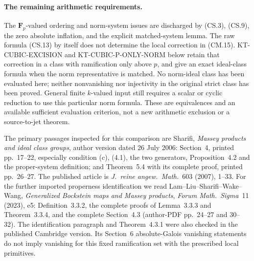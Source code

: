 \paragraph{The remaining arithmetic requirements.}
The \(\mathbf F_p\)-valued ordering and norm-system
issues are discharged by (CS.3), (CS.9), the zero
absolute inflation, and the explicit matched-system
lemma.  The raw formula (CS.13) by itself does not
determine the local correction in (CM.15).
KT-CUBIC-EXCISION and KT-CUBIC-P-ONLY-NORM below
retain that correction in a class with ramification
only above \(p\), and give an exact ideal-class
formula when the norm representative is matched.
No norm-ideal class has been evaluated here;
neither nonvanishing nor injectivity in the
original strict class has been proved.
General finite \(k\)-valued input still
requires a scalar or cyclic reduction to use this
particular norm formula.  These are equivalences
and an available sufficient evaluation criterion,
not a new arithmetic exclusion or a source-to-jet
theorem.

The primary passages inspected for this comparison are
Sharifi, \emph{Massey products and ideal class groups},
author version dated 26 July 2006: Section~4, printed
pp.~17--22, especially condition (c), (4.1), the two
generators, Proposition~4.2 and the proper-system
definition; and Theorem~5.4 with its complete proof,
printed pp.~26--27.  The published article is
\emph{J.~reine angew.~Math.}~603 (2007), 1--33.
For the further imported properness identification
we read Lam--Liu--Sharifi--Wake--Wang,
\emph{Generalized Bockstein maps and Massey products},
\emph{Forum Math.~Sigma}~11 (2023), e5:
Definition~3.3.2, the complete proofs of
Lemma~3.3.3 and Theorem~3.3.4, and the complete
Section~4.3 (author-PDF pp.~24--27 and 30--32).
The identification paragraph and Theorem~4.3.1
were also checked in the published Cambridge
version.  Its Section~6 absolute-Galois vanishing
statements do not imply vanishing for this fixed
ramification set with the prescribed local
primitives.
